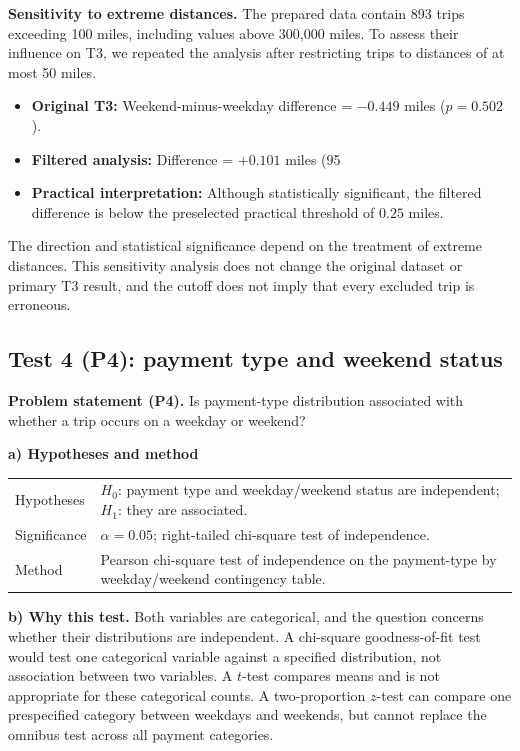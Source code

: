 \documentclass[10pt,a4paper]{article}
\begin{document}
\textbf{Sensitivity to extreme distances.} The prepared data contain 893 trips exceeding 100 miles, including values above 300,000 miles. To assess their influence on T3, we repeated the analysis after restricting trips to distances of at most 50 miles.

\begin{itemize}
\item \textbf{Original T3:} Weekend-minus-weekday difference = $-0.449$ miles ($p=0.502$).
\item \textbf{Filtered analysis:} Difference = $+0.101$ miles (95%
\item \textbf{Practical interpretation:} Although statistically significant, the filtered difference is below the preselected practical threshold of $0.25$ miles.
\end{itemize}

The direction and statistical significance depend on the treatment of extreme distances. This sensitivity analysis does not change the original dataset or primary T3 result, and the cutoff does not imply that every excluded trip is erroneous.


\subsection*{Test 4 (P4): payment type and weekend status}
\textbf{Problem statement (P4).} Is payment-type distribution associated with whether a trip occurs on a weekday or weekend?

\textbf{a) Hypotheses and method}
\begin{center}\small
\begin{tabularx}{\linewidth}{@{}L{2.5cm}Y@{}}
\toprule
Hypotheses & $H_0$: payment type and weekday/weekend status are independent; $H_1$: they are associated.\\
Significance & $\alpha=0.05$; right-tailed chi-square test of independence.\\
Method & Pearson chi-square test of independence on the payment-type by weekday/weekend contingency table.\\
\bottomrule
\end{tabularx}
\end{center}
\textbf{b) Why this test.} Both variables are categorical, and the question concerns whether their distributions are independent. A chi-square goodness-of-fit test would test one categorical variable against a specified distribution, not association between two variables. A $t$-test compares means and is not appropriate for these categorical counts. A two-proportion $z$-test can compare one prespecified category between weekdays and weekends, but cannot replace the omnibus test across all payment categories.
\end{document}
